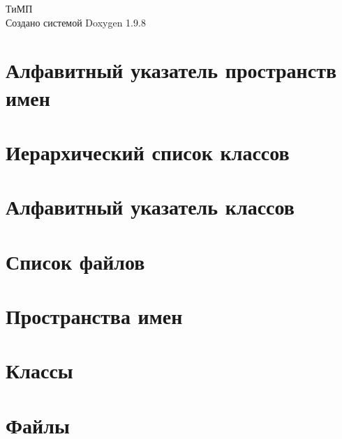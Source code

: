 \documentclass[twoside]{book}
\newcommand{\+}{\discretionary{\mbox{\scriptsize$\hookleftarrow$}}{}{}}
\newcommand{\clearemptydoublepage}{%
    \newpage{\pagestyle{empty}\cleardoublepage}%
  }
\begin{document}
  \raggedbottom
    \hypersetup{pageanchor=false,
                bookmarksnumbered=true,
                pdfencoding=unicode
               }
  \begin{titlepage}
  \vspace*{7cm}
  \begin{center}%
  {\Large ТиМП}\\
  \vspace*{1cm}
  {\large Создано системой Doxygen 1.9.8}\\
  \end{center}
  \end{titlepage}
  \clearemptydoublepage
  \tableofcontents
  \clearemptydoublepage
  \hypersetup{pageanchor=true}
\chapter{Алфавитный указатель пространств имен}

\chapter{Иерархический список классов}

\chapter{Алфавитный указатель классов}

\chapter{Список файлов}

\chapter{Пространства имен}

\chapter{Классы}





\chapter{Файлы}


























  \backmatter
  \newpage
  \clearemptydoublepage
  \printindex
\end{document}
